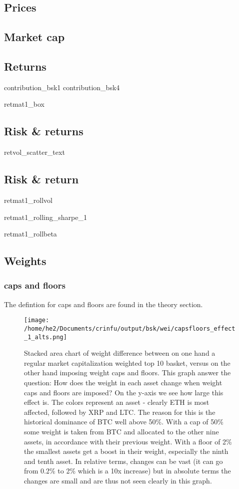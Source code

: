 \documentclass[12,]{article}
\begin{document}
\subsection{Prices}\label{prices-2}

\subsection{Market cap}\label{market-cap-1}

\subsection{Returns}\label{returns-2}

contribution\_bsk1 contribution\_bsk4

retmat1\_box

\subsection{Risk \& returns}\label{risk-returns}

retvol\_scatter\_text

\subsection{Risk \& return}\label{risk-return}

retmat1\_rollvol

retmat1\_rolling\_sharpe\_1

retmat1\_rollbeta

\subsection{Weights}\label{weights-1}

\subsubsection{caps and floors}\label{caps-and-floors}

The defintion for caps and floors are found in the theory section.

\begin{figure}
\centering
\texttt{[image: /home/he2/Documents/crinfu/output/bsk/wei/capsfloors\_effect\_1\_alts.png]}
\caption{Stacked area chart of weight difference between on one hand a
regular market capitalization weighted top 10 basket, versus on the
other hand imposing weight caps and floors. This graph answer the
question: How does the weight in each asset change when weight caps and
floors are imposed? On the y-axis we see how large this effect is. The
colors represent an asset - clearly ETH is most affected, followed by
XRP and LTC. The reason for this is the historical dominance of BTC well
above 50\%. With a cap of 50\% some weight is taken from BTC and
allocated to the other nine assets, in accordance with their previous
weight. With a floor of 2\% the smallest assets get a boost in their
weight, especially the ninth and tenth asset. In relative terms, changes
can be vast (it can go from 0.2\% to 2\% which is a 10x increase) but in
absolute terms the changes are small and are thus not seen clearly in
this graph.}
\end{figure}
\end{document}
